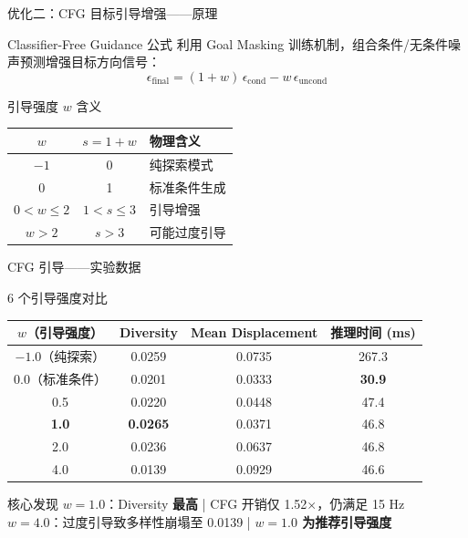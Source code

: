 \documentclass[aspectratio=169,10pt]{beamer}
\begin{document}
\begin{frame}{优化二：CFG 目标引导增强——原理}
\begin{block}{Classifier-Free Guidance 公式}
利用 Goal Masking 训练机制，组合条件/无条件噪声预测增强目标方向信号：
\[
\epsilon_{\text{final}} = (1+w)\,\epsilon_{\text{cond}} - w\,\epsilon_{\text{uncond}}
\]
\end{block}
\vspace{2mm}
\begin{block}{引导强度 $w$ 含义}
\centering
\begin{tabular}{ccp{6cm}}
\toprule
$w$ & $s=1+w$ & \textbf{物理含义} \\
\midrule
$-1$ & 0 & 纯探索模式 \\
0 & 1 & 标准条件生成 \\
$0<w\leq 2$ & $1<s\leq 3$ & 引导增强 \\
$w>2$ & $s>3$ & 可能过度引导 \\
\bottomrule
\end{tabular}
\end{block}
\end{frame}

\begin{frame}{CFG 引导——实验数据}
\begin{block}{6 个引导强度对比}
\centering
\begin{tabular}{cccc}
\toprule
$w$（引导强度） & \textbf{Diversity} & \textbf{Mean Displacement} & \textbf{推理时间 (ms)} \\
\midrule
$-1.0$（纯探索） & 0.0259 & 0.0735 & 267.3 \\
0.0（标准条件） & 0.0201 & 0.0333 & \textbf{30.9} \\
0.5 & 0.0220 & 0.0448 & 47.4 \\
\rowcolor{green!10}
\textbf{1.0} & \textbf{0.0265} & 0.0371 & 46.8 \\
2.0 & 0.0236 & 0.0637 & 46.8 \\
\rowcolor{red!10}
4.0 & 0.0139 & 0.0929 & 46.6 \\
\bottomrule
\end{tabular}
\end{block}
\vspace{3mm}
\begin{alertblock}{核心发现}
\centering
$w{=}1.0$：Diversity \textbf{最高}  \quad|\quad
CFG 开销仅 1.52$\times$，仍满足 15 Hz\\[1mm]
$w{=}4.0$：过度引导致多样性崩塌至 0.0139 \quad|\quad
\textbf{$w{=}1.0$ 为推荐引导强度}
\end{alertblock}
\end{frame}
\end{document}
